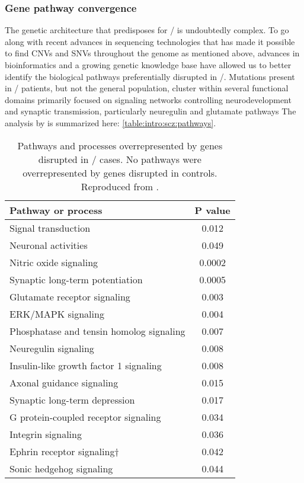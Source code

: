 \subsubsection{Gene pathway convergence}
The genetic architecture that predisposes for \scz/ is undoubtedly complex.
To go along with recent advances in sequencing technologies that has made it possible to find CNVs and SNVs throughout the genome as mentioned above, advances in bioinformatics and a growing genetic knowledge base have allowed us to better identify the biological pathways preferentially disrupted in \scz/.
Mutations present in \scz/ patients, but not the general population, cluster within several functional domains primarily focused on signaling networks controlling neurodevelopment and synaptic transmission, particularly neuregulin and glutamate pathways \citep{Walsh2008, Glessner2010}
The analysis by \citeauthor{Walsh2008} is summarized here: \autoref{table:intro:scz:pathways}.

\citep{Gilman2012}

\begin{table}
\centering
\begin{tabular}{l c}
\textbf{Pathway or process} & \textbf{P value} \\
\hline
Signal transduction & 0.012 \\
Neuronal activities & 0.049 \\
Nitric oxide signaling & 0.0002 \\
Synaptic long-term potentiation & 0.0005 \\
Glutamate receptor signaling & 0.003 \\
ERK/MAPK signaling & 0.004 \\
Phosphatase and tensin homolog signaling & 0.007 \\
Neuregulin signaling & 0.008 \\
Insulin-like growth factor 1 signaling & 0.008 \\
Axonal guidance signaling & 0.015 \\
Synaptic long-term depression & 0.017 \\
G protein-coupled receptor signaling & 0.034 \\
Integrin signaling & 0.036 \\
Ephrin receptor signaling† & 0.042 \\
Sonic hedgehog signaling & 0.044 \\
\end{tabular}
\caption[Pathways implicated in \scz/]{Pathways and processes overrepresented by genes disrupted in \scz/ cases. No pathways were overrepresented by genes disrupted in controls.
Reproduced from \citet{Walsh2008}.}
\label{table:intro:scz:pathways}
\end{table}

